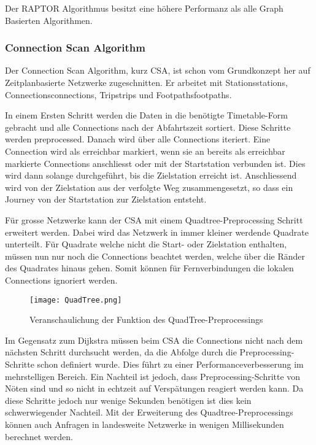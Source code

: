 Der RAPTOR Algorithmus besitzt eine höhere Performanz als alle Graph Basierten Algorithmen. ~\cite{raptor}

\subsubsection{Connection Scan Algorithm}
\label{sec:Connection Scan Algorithm}
Der Connection Scan Algorithm, kurz CSA, ist schon vom Grundkonzept her auf Zeitplanbasierte Netzwerke zugeschnitten. Er arbeitet mit Stations\gls{stations}, Connections\gls{connections}, Trips\gls{trips} und Footpaths\gls{footpaths}. 

In einem Ersten Schritt werden die Daten in die benötigte Timetable-Form gebracht und alle Connections nach der Abfahrtszeit sortiert. Diese Schritte werden preprocessed. Danach wird über alle Connections iteriert. Eine Connection wird als erreichbar markiert, wenn sie an bereits als erreichbar markierte Connections anschliesst oder mit der Startstation verbunden ist. Dies wird dann solange durchgeführt, bis die Zielstation erreicht ist. Anschliessend wird von der Zielstation aus der verfolgte Weg zusammengesetzt, so dass ein Journey von der Startstation zur Zielstation entsteht. 

Für grosse Netzwerke kann der CSA mit einem Quadtree-Preprocessing Schritt erweitert werden. Dabei wird das Netzwerk in immer kleiner werdende Quadrate unterteilt. Für Quadrate welche nicht die Start- oder Zielstation enthalten, müssen nun nur noch die Connections beachtet werden, welche über die Ränder des Quadrates hinaus gehen. Somit können für Fernverbindungen die lokalen Connections ignoriert werden.
\begin{figure}[]
	\centering
	\texttt{[image: QuadTree.png]}
	\caption{Veranschaulichung der Funktion des QuadTree-Preprocessings ~\cite{csa}}
	\label{fig:QuadTree}
\end{figure}


Im Gegensatz zum Dijkstra müssen beim CSA die Connections nicht nach dem nächsten Schritt durchsucht werden, da die Abfolge durch die Preprocessing-Schritte schon definiert wurde. Dies führt zu einer Performanceverbesserung im mehrstelligen Bereich. Ein Nachteil ist jedoch, dass Preprocessing-Schritte von Nöten sind und so nicht in echtzeit auf Verspätungen reagiert werden kann. Da diese Schritte jedoch nur wenige Sekunden benötigen ist dies kein schwerwiegender Nachteil. Mit der Erweiterung des Quadtree-Preprocessings können auch Anfragen in landesweite Netzwerke in wenigen Millisekunden berechnet werden. 

